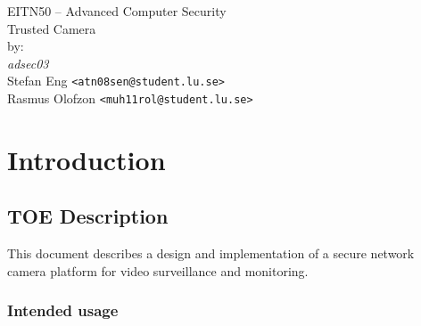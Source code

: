 \documentclass[10pt]{article}
\begin{document}

  \thispagestyle{empty}
  \vspace*{3cm}
  \begin{center}
    \huge{EITN50 -- Advanced Computer Security} \\
    \vspace{0.3cm}
    \LARGE{Trusted Camera} \\
    \vspace{1cm}
    \large{by: \\ \vspace{0.2cm}
	\textit{adsec03} \\
        Stefan Eng \texttt{<atn08sen@student.lu.se>} \\
        Rasmus Olofzon \texttt{<muh11rol@student.lu.se>}
        } \\
  \end{center}


  \newpage

  \section{Introduction}



    \subsection{TOE Description}

      This document describes a design and implementation of a secure network
      camera platform for video surveillance and monitoring.

      \subsubsection{Intended usage}
\end{document}
